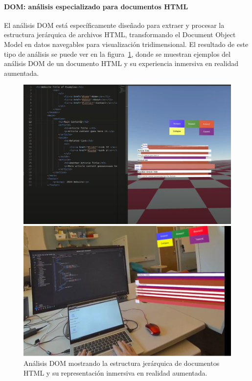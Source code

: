 \documentclass[a4paper, 12pt]{book}
\begin{document}
\paragraph{DOM: análisis especializado para documentos HTML}
El análisis DOM está específicamente diseñado para extraer y procesar la estructura jerárquica de archivos HTML, transformando el Document Object Model en datos navegables para visualización tridimensional. El resultado de este tipo de análisis se puede ver en la figura~\ref{fig:dom-analisis}, donde se muestran ejemplos del análisis DOM de un documento HTML y su experiencia inmersiva en realidad aumentada.
\begin{figure}[H]
\centering
\begin{minipage}[b]{0.48\textwidth}
\centering
\includegraphics[width=\textwidth]{img/dom-analisis-html.png}
\end{minipage}
\hfill
\begin{minipage}[b]{0.48\textwidth}
\centering
\includegraphics[width=\textwidth]{img/dom-experiencia-ar.png}
\end{minipage}
\caption{Análisis DOM mostrando la estructura jerárquica de documentos HTML y su representación inmersiva en realidad aumentada.}
\label{fig:dom-analisis}
\end{figure}
\end{document}
